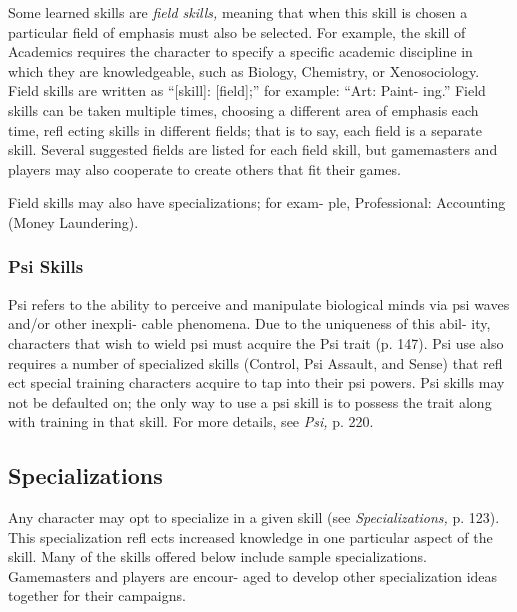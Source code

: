 Some learned skills are \textit{field skills,} meaning that when 
this skill is chosen a particular field of emphasis must 
also be selected. For example, the skill of Academics 
requires the character to specify a specific academic 
discipline in which they are knowledgeable, such as 
Biology, Chemistry, or Xenosociology. Field skills are 
written as ``[skill]: [field];'' for example: ``Art: Paint-
ing.'' Field skills can be taken multiple times, choosing 
a different area of emphasis each time, refl ecting skills 
in different fields; that is to say, each field is a separate 
skill. Several suggested fields are listed for each field 
skill, but gamemasters and players may also cooperate 
to create others that fit their games.

Field skills may also have specializations; for exam-
ple, Professional: Accounting (Money Laundering).

\subsubsection{Psi Skills}

Psi refers to the ability to perceive and manipulate 
biological minds via psi waves and/or other inexpli-
cable phenomena. Due to the uniqueness of this abil-
ity, characters that wish to wield psi must acquire the 
Psi trait (p. 147). Psi use also requires a number of 
specialized skills (Control, Psi Assault, and Sense) that 
refl ect special training characters acquire to tap into 
their psi powers. Psi skills may not be defaulted on; 
the only way to use a psi skill is to possess the trait 
along with training in that skill. For more details, see 
\textit{Psi,} p. 220.

\subsection{Specializations}

Any character may opt to specialize in a given skill 
(see \textit{Specializations,} p. 123). This specialization refl ects 
increased knowledge in one particular aspect of the 
skill. Many of the skills offered below include sample 
specializations. Gamemasters and players are encour-
aged to develop other specialization ideas together for 
their campaigns.

